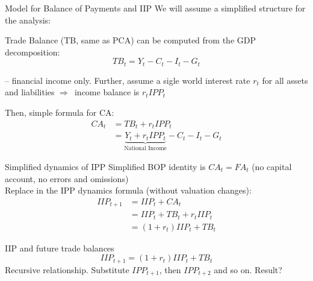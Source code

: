 \documentclass{beamer}
\newcommand{\tb}[1]{{\color{blue}{\textbf{#1}}}}
\newenvironment{mytemize}
{\vfill\itemize[nolistsep,itemsep=\fill,label=\color{blue}{$\triangleright$}]}
  {\enditemize}
\newcommand{\rarr}{$\Rightarrow$\ }
\begin{document}
\begin{frame}{Model for Balance of Payments and IIP}
  We will assume a simplified structure for the analysis:
  \begin{mytemize}
  \item Trade Balance (TB, same as  PCA) can be computed from the GDP decomposition: $$TB_t = Y_t - C_t - I_t - G_t$$
  \item \tb{Income balance} -- financial income only. 
  Further, assume a sigle world interest rate $r_t$ for all assets and liabilities \rarr income balance is $r_t IPP_t$
\item Then, simple formula for CA: 
  \begin{align*}
  CA_t &= TB_t + r_t IPP_t \\ &= \underbrace{Y_t+ r_t IPP_t}_{\text{National Income}} - C_t - I_t - G_t 
  \end{align*}

  \end{mytemize}

\end{frame}

  \begin{frame}{Simplified dynamics of IPP}
	Simplified BOP identity is $CA_t = FA_t$ (no capital account, no errors and omissions)\\
	\vfill
	Replace in the IPP dynamics formula (without valuation changes): 
	  \begin{align*}
	  IIP_{t+1} &= IIP_t + CA_t \\
	  			&= IIP_t + TB_t + r_t IIP_t \\
	  &= (1+r_t) IIP_t + TB_t 
	  \end{align*}
  \end{frame}

  \begin{frame}{IIP and future trade balances}
	\vspace{-5cm}
	$$IIP_{t+1} = (1+r_t) IIP_t + TB_t $$
	Recursive relationship. Substitute $IPP_{t+1}$, then $IPP_{t+2}$ and so on. Result?
	

  \end{frame}
\end{document}
